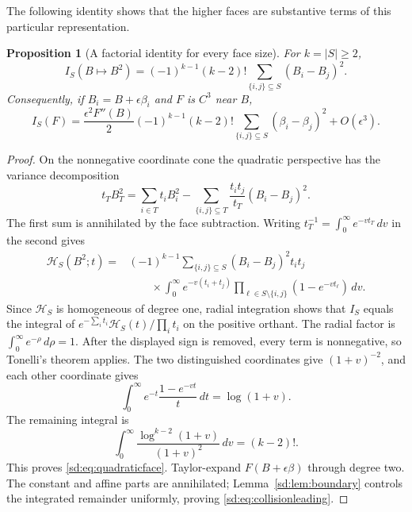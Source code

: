\documentclass[11pt,a4paper]{article}
\numberwithin{equation}{section}
\newtheorem{proposition}[theorem]{Proposition}
\theoremstyle{definition}
\theoremstyle{remark}
\begin{document}
The following identity shows that the higher faces are substantive
terms of this particular representation.

\begin{proposition}[A factorial identity for every face size]
\label{sd:prop:quadraticface}
For $k=|S|\ge2$,
\begin{equation}\label{sd:eq:quadraticface}
 \boxed{\displaystyle
 I_S(B\mapsto B^2)=(-1)^{k-1}(k-2)!
                             \sum_{\{i,j\}\subseteq S}(B_i-B_j)^2.}
\end{equation}
Consequently, if $B_i=B+\epsilon\beta_i$ and $F$ is $C^3$ near $B$,
\begin{equation}\label{sd:eq:collisionleading}
 I_S(F)=\frac{\epsilon^2F''(B)}2(-1)^{k-1}(k-2)!
           \sum_{\{i,j\}\subseteq S}(\beta_i-\beta_j)^2
                         +O(\epsilon^3).
\end{equation}
\end{proposition}
\begin{proof}
On the nonnegative coordinate cone the quadratic perspective has the
variance decomposition
\[
 t_T B_T^2=\sum_{i\in T}t_iB_i^2
       -\sum_{\{i,j\}\subseteq T}
                 \frac{t_it_j}{t_T}(B_i-B_j)^2.
\]
The first sum is annihilated by the face subtraction.  Writing
$t_T^{-1}=\int_0^\infty e^{-vt_T}\,dv$ in the second gives
\begin{align*}
 \mathcal H_S(B^2;t)
  ={}&(-1)^{k-1}\sum_{\{i,j\}\subseteq S}(B_i-B_j)^2t_it_j\\
 &\qquad\times\int_0^\infty e^{-v(t_i+t_j)}
                 \prod_{\ell\in S\setminus\{i,j\}}
                         (1-e^{-vt_\ell})\,dv.
\end{align*}
Since $\mathcal H_S$ is homogeneous of degree one, radial integration
shows that $I_S$ equals the integral of
$e^{-\sum_i t_i}\mathcal H_S(t)/\prod_i t_i$ on the positive
orthant.  The radial factor is $\int_0^\infty e^{-\rho}\,d\rho=1$.
After the displayed sign is removed, every term is nonnegative, so
Tonelli's theorem applies.  The two distinguished coordinates give
$(1+v)^{-2}$, and each other coordinate gives
\[
 \int_0^\infty e^{-t}\frac{1-e^{-vt}}{t}\,dt=\log(1+v).
\]
The remaining integral is
\[
 \int_0^\infty\frac{\log^{k-2}(1+v)}{(1+v)^2}\,dv=(k-2)!.
\]
This proves \eqref{sd:eq:quadraticface}.  Taylor-expand $F(B+\epsilon
\beta)$ through degree two.  The constant and affine parts are
annihilated; Lemma~\ref{sd:lem:boundary} controls the integrated
remainder uniformly, proving \eqref{sd:eq:collisionleading}.
\end{proof}
\end{document}
